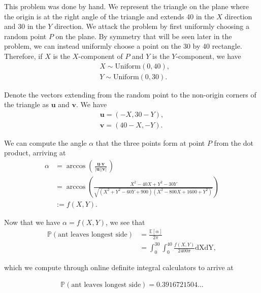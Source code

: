 \documentclass[12pt]{article}
\begin{document}
 
\noindent
This problem was done by hand. We represent the triangle on the plane where the origin is at the right angle of the triangle and extends 40 in the $X$ direction and 30 in the $Y$ direction. We attack the problem by first uniformly choosing a random point $P$ on the plane. By symmetry that will be seen later in the problem, we can instead uniformly choose a point on the 30 by 40 rectangle. Therefore, if $X$ is the $X$-component of $P$ and $Y$ is the $Y$-component, we have
\begin{align*}
    &X \sim \text{Uniform}(0, 40),\\
    &Y \sim \text{Uniform}(0, 30).
\end{align*}

\noindent
Denote the vectors extending from the random point to the non-origin corners of the triangle as $\textbf{u}$ and $\textbf{v}$. We have
\begin{align*}
    \textbf{u} = (-X, 30 - Y),\\
    \textbf{v} = (40 - X, -Y).
\end{align*}

\noindent
We can compute the angle $\alpha$ that the three points form at point $P$ from the dot product, arriving at
\begin{align*}
    \alpha &= \arccos\left(\frac{\textbf{u} \cdot \textbf{v}}{|\textbf{u}| |\textbf{v}|}\right)\\
    &= \arccos\left(\frac{X^2 - 40X + Y^2 - 30Y}{\sqrt{(X^2 + Y^2 - 60Y + 900)(X^2 - 800X + 1600 + Y^2)}}\right)\\
    &:= f(X, Y).
\end{align*}

\noindent
Now that we have $\alpha = f(X, Y)$, we see that 
\begin{align*}
    \mathbb{P}(\text{ant leaves longest side}) &= \frac{\mathbb{E}[\alpha]}{2\pi}\\
    &= \int_0^{30}\int_0^{40} \frac{f(X, Y)}{2400\pi} \text{dX}\text{dY},
\end{align*}

\noindent
which we compute through online definite integral calculators to arrive at

\begin{align*}
    \mathbb{P}(\text{ant leaves longest side}) = 0.3916721504...
\end{align*}
\end{document}
